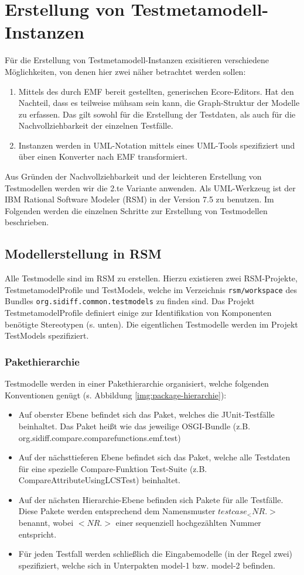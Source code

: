 \section{Erstellung von Testmetamodell-Instanzen}
Für die Erstellung von Testmetamodell-Instanzen exisitieren verschiedene Möglichkeiten, von denen hier zwei näher betrachtet werden sollen:
\begin{enumerate}
 \item Mittels des durch EMF bereit gestellten, generischen Ecore-Editors. Hat den Nachteil, dass es teilweise mühsam sein kann, die Graph-Struktur der Modelle zu erfassen. Das gilt sowohl für die Erstellung der Testdaten, als auch für die Nachvollziehbarkeit der einzelnen Testfälle.
 \item Instanzen werden in UML-Notation mittels eines UML-Tools spezifiziert und über einen Konverter nach EMF transformiert.
\end{enumerate}
Aus Gründen der Nachvollziehbarkeit und der leichteren Erstellung von Testmodellen werden wir die 2.te Variante anwenden. Als UML-Werkzeug ist der IBM Rational Software Modeler (RSM) in der Version 7.5 zu benutzen. Im Folgenden werden die einzelnen Schritte zur Erstellung von Testmodellen beschrieben.


\subsection{Modellerstellung in RSM}
Alle Testmodelle sind im RSM zu erstellen. Hierzu existieren zwei RSM-Projekte, TestmetamodelProfile und TestModels, welche im Verzeichnis \texttt{rsm/workspace} des Bundles \texttt{org.sidiff.common.testmodels} zu finden sind. Das Projekt TestmetamodelProfile definiert einige zur Identifikation von Komponenten benötigte Stereotypen (s. unten). Die eigentlichen Testmodelle werden im Projekt TestModels spezifiziert. 

\subsubsection{Pakethierarchie} 
Testmodelle werden in einer Pakethierarchie organisiert, welche folgenden Konventionen genügt (s. Abbildung \ref{img:package-hierarchie}):

\begin{itemize}
 \item Auf oberster Ebene befindet sich das Paket, welches die JUnit-Testfälle beinhaltet. Das Paket heißt wie das jeweilige OSGI-Bundle (z.B. org.sidiff.compare.comparefunctions.emf.test)
 \item Auf der nächsttieferen Ebene befindet sich das Paket, welche alle Testdaten für eine spezielle Compare-Funktion Test-Suite (z.B. CompareAttributeUsingLCSTest) beinhaltet.
 \item Auf der nächsten Hierarchie-Ebene befinden sich Pakete für alle Testfälle. Diese Pakete werden entsprechend dem Namensmuster $testcase_<NR.>$ benannt, wobei $<NR.>$ einer sequenziell hochgezählten Nummer entspricht.
 \item Für jeden Testfall werden schließlich die Eingabemodelle (in der Regel zwei) spezifiziert, welche sich in Unterpakten model-1 bzw. model-2 befinden. 
\end{itemize}

